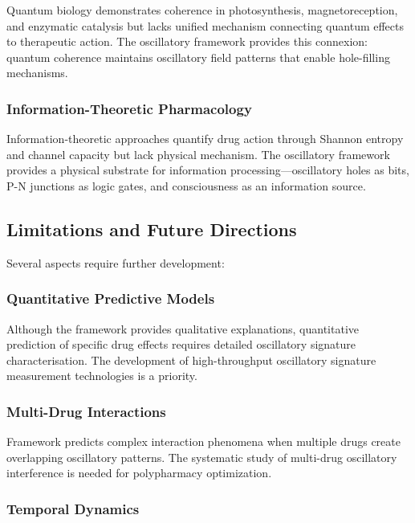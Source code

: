 \documentclass{article}
\theoremstyle{definition}
\theoremstyle{remark}
\begin{document}
Quantum biology demonstrates coherence in photosynthesis, magnetoreception, and enzymatic catalysis\cite{Engel2007,Lambert2013,Klinman2013} but lacks unified mechanism connecting quantum effects to therapeutic action. The oscillatory framework provides this connexion: quantum coherence maintains oscillatory field patterns that enable hole-filling mechanisms.

\subsubsection{Information-Theoretic Pharmacology}

Information-theoretic approaches quantify drug action through Shannon entropy and channel capacity\cite{Waltermann2014} but lack physical mechanism. The oscillatory framework provides a physical substrate for information processing—oscillatory holes as bits, P-N junctions as logic gates, and consciousness as an information source.

\subsection{Limitations and Future Directions}

Several aspects require further development:

\subsubsection{Quantitative Predictive Models}

Although the framework provides qualitative explanations, quantitative prediction of specific drug effects requires detailed oscillatory signature characterisation. The development of high-throughput oscillatory signature measurement technologies is a priority.

\subsubsection{Multi-Drug Interactions}

Framework predicts complex interaction phenomena when multiple drugs create overlapping oscillatory patterns. The systematic study of multi-drug oscillatory interference is needed for polypharmacy optimization.

\subsubsection{Temporal Dynamics}
\end{document}
